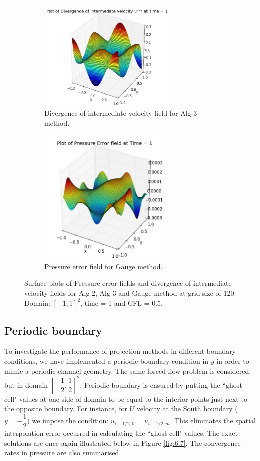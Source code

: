 \begin{figure}[H]
\begin{subfigure}[t]{2.2in}
	\end{subfigure}
	\quad
	\begin{subfigure}[t]{2.6in}
		\centering
		\includegraphics[width=2.6in]{figures/Pm2_pf2_cN_np_div_uvstar_t_1_grid_120.jpg}
		\caption{Divergence of intermediate velocity field for Alg 3 method.}\label{fig:6.6d}
	\end{subfigure}
	\quad
	\begin{subfigure}[t]{2.5in}
		\centering
		\includegraphics[width=2.5in]{figures/Gauge_pf2_P_error_t_1_grid_120.jpg}
		\caption{Pressure error field for Gauge method. }\label{fig:6.6e}
	\end{subfigure}
	\caption{Surface plots of Pressure error fields and divergence of intermediate velocity fields for Alg 2, Alg 3 and Gauge method at grid size of 120. Domain: $[-1,1]^2$, time = 1 and CFL = 0.5. }\label{fig:6.6}
\end{figure}

\subsection*{Periodic boundary}
To investigate the performance of projection methods in different boundary conditions, we have implemented a periodic boundary condition in $y$ in order to mimic a periodic channel geometry. The same forced flow problem is considered, but in domain $[-\dfrac{1}{2},\dfrac{1}{2}]^2$. Periodic boundary is ensured by putting the ``ghost cell" values at one side of domain to be equal to the interior points just next to the opposite boundary. For instance, for $U$ velocity at the South boundary ($y = -\dfrac{1}{2}$) we impose the condition: $u_{i-1/2,0} = u_{i-1/2,m}$. This eliminates the spatial interpolation error occurred in calculating the ``ghost cell" values. The exact solutions are once again illustrated below in Figure \ref{fig:6.7}. The convergence rates in pressure are also summarised.\\

